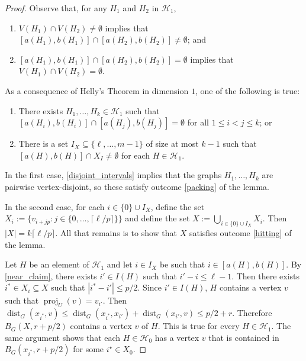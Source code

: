\documentclass{patmorin}
\DeclareMathOperator{\proj}{proj}
\DeclareMathOperator{\dist}{dist}
\begin{document}
\begin{proof}
  Observe that, for any $H_1$ and $H_2$ in $\mathcal{H}_1$,
  \begin{enumerate}[nosep,nolistsep,label=\rm({o}\arabic*),ref=({o}\arabic*)]
    \item\label{disjoint_intervals} $V(H_1)\cap V(H_2)\neq\emptyset$ implies that $[a(H_1),b(H_1)]\cap [a(H_2),b(H_2)]\neq\emptyset$; and
    \item\label{intersecting_graphs} $[a(H_1),b(H_1)]\cap [a(H_2),b(H_2)]=\emptyset$ implies that $V(H_1)\cap V(H_2)=\emptyset$.
  \end{enumerate}
  As a consequence of Helly's Theorem in dimension $1$, one of the following is true:
  \begin{enumerate}[nosep,nolistsep,label=\rm(\alph*),ref=(\alph*)]
    \item There exists $H_1,\ldots,H_k\in\mathcal{H}_1$ such that $[a(H_i),b(H_i)]\cap[a(H_j),b(H_j)]=\emptyset$ for all $1\le i < j\le k$; or
    \item There is a set $I_X\subseteq \{\ell,\ldots,m-1\}$ of size at most $k-1$ such that $[a(H),b(H)]\cap X_I\neq\emptyset$ for each $H\in\mathcal{H}_1$.
  \end{enumerate}
  In the first case, \ref{disjoint_intervals} implies that the graphs $H_1,\ldots,H_k$ are pairwise vertex-disjoint, so these satisfy outcome \ref{packing} of the lemma.

  In the second case,  for each $i\in \{0\}\cup I_X$, define the set $X_i:=\{v_{i+jp}:j\in\{0,\ldots,\lceil\ell/p\rceil\}\}$ and define the set $X:=\bigcup_{i\in \{0\}\cup I_X} X_i$.  Then $|X|=k\lceil \ell/p\rceil$.  All that remains is to show that $X$ satisfies outcome \ref{hitting} of the lemma.

  Let $H$ be an element of $\mathcal{H}_1$ and let $i\in I_X$ be such that $i\in [a(H),b(H)]$. By \cref{near_claim},  there exists $i'\in I(H)$ such that $i'-i\le\ell-1$.  Then there exists $i^*\in X_i\subseteq X$ such that $|i^*-i'|\le p/2$.  Since $i'\in I(H)$, $H$ contains a vertex $v$ such that $\proj_U(v)=v_{i'}$.  Then $\dist_G(x_{i^*},v)\le \dist_G(x_{i^*},x_{i'})+\dist_G(x_{i'},v)\le p/2+r$. Therefore $B_G(X,r+p/2)$ contains a vertex $v$ of $H$.  This is true for every $H\in\mathcal{H}_1$.  The same argument shows that each $H\in\mathcal{H}_0$ has a vertex $v$ that is contained in $B_G(x_{i^*},r+p/2)$ for some $i^\star\in X_0$.
\end{proof}
\end{document}
